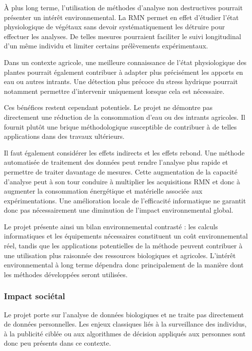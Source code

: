 \documentclass[12pt,a4paper,twoside]{article}
\begin{document}
À plus long terme, l'utilisation de méthodes d'analyse non destructives pourrait présenter un intérêt environnemental. La RMN permet en effet d'étudier l'état physiologique de végétaux sans devoir systématiquement les détruire pour effectuer les analyses. De telles mesures pourraient faciliter le suivi longitudinal d'un même individu et limiter certains prélèvements expérimentaux.

Dans un contexte agricole, une meilleure connaissance de l'état physiologique des plantes pourrait également contribuer à adapter plus précisément les apports en eau ou autres intrants. Une détection plus précoce du stress hydrique pourrait notamment permettre d'intervenir uniquement lorsque cela est nécessaire.

Ces bénéfices restent cependant potentiels. Le projet ne démontre pas directement une réduction de la consommation d'eau ou des intrants agricoles. Il fournit plutôt une brique méthodologique susceptible de contribuer à de telles applications dans des travaux ultérieurs.

Il faut également considérer les effets indirects et les effets rebond. Une méthode automatisée de traitement des données peut rendre l'analyse plus rapide et permettre de traiter davantage de mesures. Cette augmentation de la capacité d'analyse peut à son tour conduire à multiplier les acquisitions RMN et donc à augmenter la consommation énergétique et matérielle associée aux expérimentations. Une amélioration locale de l'efficacité informatique ne garantit donc pas nécessairement une diminution de l'impact environnemental global.

Le projet présente ainsi un bilan environnemental contrasté : les calculs informatiques et les équipements nécessaires constituent un coût environnemental réel, tandis que les applications potentielles de la méthode peuvent contribuer à une utilisation plus raisonnée des ressources biologiques et agricoles. L'intérêt environnemental à long terme dépendra donc principalement de la manière dont les méthodes développées seront utilisées.

\subsubsection{Impact sociétal}
\label{subsubsec:rse_impact_societal}

Le projet porte sur l'analyse de données biologiques et ne traite pas directement de données personnelles. Les enjeux classiques liés à la surveillance des individus, à la publicité ciblée ou aux algorithmes de décision appliqués aux personnes sont donc peu présents dans ce contexte.
\end{document}
